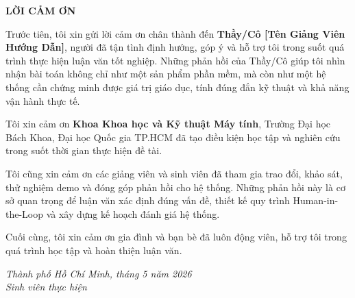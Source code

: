 \thispagestyle{empty}
\begin{center}
    \textbf{\Large LỜI CẢM ƠN}
\end{center}

\vspace{1cm}

Trước tiên, tôi xin gửi lời cảm ơn chân thành đến \textbf{Thầy/Cô [Tên Giảng
Viên Hướng Dẫn]}, người đã tận tình định hướng, góp ý và hỗ trợ tôi trong
suốt quá trình thực hiện luận văn tốt nghiệp. Những phản hồi của Thầy/Cô giúp
tôi nhìn nhận bài toán không chỉ như một sản phẩm phần mềm, mà còn như một hệ
thống cần chứng minh được giá trị giáo dục, tính đúng đắn kỹ thuật và khả năng
vận hành thực tế.

Tôi xin cảm ơn \textbf{Khoa Khoa học và Kỹ thuật Máy tính}, Trường Đại học
Bách Khoa, Đại học Quốc gia TP.HCM đã tạo điều kiện học tập và nghiên cứu
trong suốt thời gian thực hiện đề tài.

Tôi cũng xin cảm ơn các giảng viên và sinh viên đã tham gia trao đổi, khảo
sát, thử nghiệm demo và đóng góp phản hồi cho hệ thống. Những phản hồi này là
cơ sở quan trọng để luận văn xác định đúng vấn đề, thiết kế quy trình
Human-in-the-Loop và xây dựng kế hoạch đánh giá hệ thống.

Cuối cùng, tôi xin cảm ơn gia đình và bạn bè đã luôn động viên, hỗ trợ tôi
trong quá trình học tập và hoàn thiện luận văn.

\vspace{1.5cm}

\begin{flushright}
    \textit{Thành phố Hồ Chí Minh, tháng 5 năm 2026}\\[0.5cm]
    \textit{Sinh viên thực hiện}
\end{flushright}
